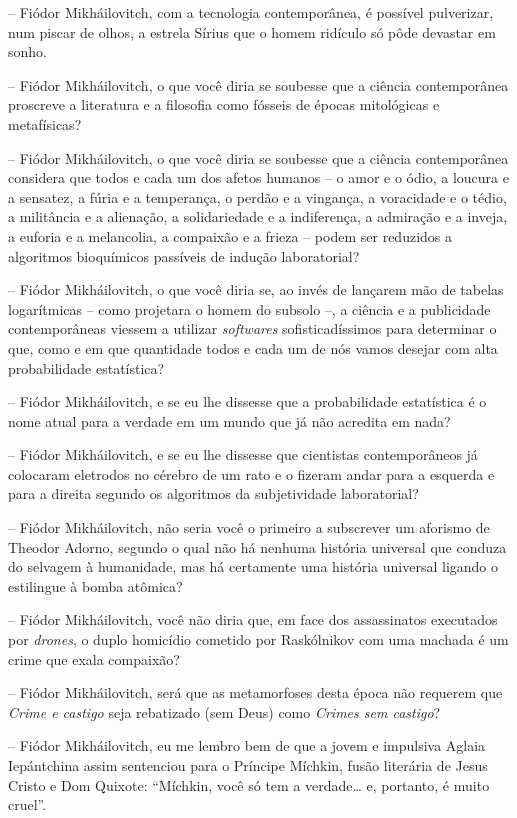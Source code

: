 -- Fiódor Mikháilovitch, com a tecnologia contemporânea, é possível
pulverizar, num piscar de olhos, a estrela Sírius que o homem ridículo
só pôde devastar em sonho.

-- Fiódor Mikháilovitch, o que você diria se soubesse que a ciência
contemporânea proscreve a literatura e a filosofia como fósseis de
épocas mitológicas e metafísicas?

-- Fiódor Mikháilovitch, o que você diria se soubesse que a ciência
contemporânea considera que todos e cada um dos afetos humanos -- o amor
e o ódio, a loucura e a sensatez, a fúria e a temperança, o perdão e a
vingança, a voracidade e o tédio, a militância e a alienação, a
solidariedade e a indiferença, a admiração e a inveja, a euforia e a
melancolia, a compaixão e a frieza -- podem ser reduzidos a algoritmos
bioquímicos passíveis de indução laboratorial?

-- Fiódor Mikháilovitch, o que você diria se, ao invés de lançarem mão
de tabelas logarítmicas -- como projetara o homem do subsolo --, a
ciência e a publicidade contemporâneas viessem a utilizar
\emph{softwares} sofisticadíssimos para determinar o que, como e em que
quantidade todos e cada um de nós vamos desejar com alta probabilidade
estatística?

-- Fiódor Mikháilovitch, e se eu lhe dissesse que a probabilidade
estatística é o nome atual para a verdade em um mundo que já não
acredita em nada?

-- Fiódor Mikháilovitch, e se eu lhe dissesse que cientistas
contemporâneos já colocaram eletrodos no cérebro de um rato e o fizeram
andar para a esquerda e para a direita segundo os algoritmos da
subjetividade laboratorial?

-- Fiódor Mikháilovitch, não seria você o primeiro a subscrever um
aforismo de Theodor Adorno, segundo o qual não há nenhuma história
universal que conduza do selvagem à humanidade, mas há certamente uma
história universal ligando o estilingue à bomba atômica?

-- Fiódor Mikháilovitch, você não diria que, em face dos assassinatos
executados por \emph{drones}, o duplo homicídio cometido por Raskólnikov
com uma machada é um crime que exala compaixão?

-- Fiódor Mikháilovitch, será que as metamorfoses desta época não
requerem que \emph{Crime e castigo} seja rebatizado (sem Deus) como
\emph{Crimes sem castigo}?

-- Fiódor Mikháilovitch, eu me lembro bem de que a jovem e impulsiva
Aglaia Iepántchina assim sentenciou para o Príncipe Míchkin, fusão
literária de Jesus Cristo e Dom Quixote: ``Míchkin, você só tem a
verdade\ldots{} e, portanto, é muito cruel''.

